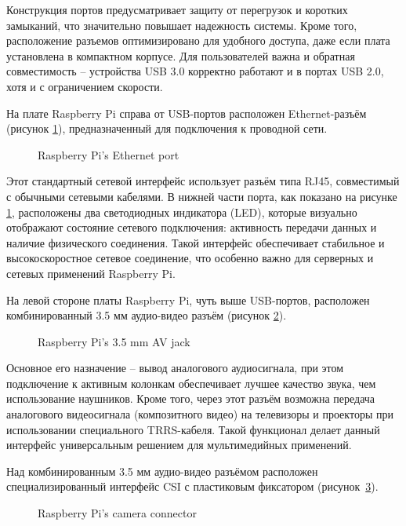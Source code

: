 Конструкция портов предусматривает защиту от перегрузок и коротких замыканий, что значительно повышает надежность системы. Кроме того, расположение разъемов оптимизировано для удобного доступа, даже если плата установлена в компактном корпусе. Для пользователей важна и обратная совместимость -- устройства USB 3.0 корректно работают и в портах USB 2.0, хотя и с ограничением скорости.

На плате Raspberry Pi справа от USB-портов расположен Ethernet-разъём (рисунок \ref{fig:ethernet}), предназначенный для подключения к проводной сети.

\begin{figure}[H]
	\centering
	\caption{Raspberry Pi’s Ethernet port}
	\label{fig:ethernet}
\end{figure}

Этот стандартный сетевой интерфейс использует разъём типа RJ45, совместимый с обычными сетевыми кабелями. В нижней части порта, как показано на рисунке \ref{fig:ethernet}, расположены два светодиодных индикатора (LED), которые визуально отображают состояние сетевого подключения: активность передачи данных и наличие физического соединения. Такой интерфейс обеспечивает стабильное и высокоскоростное сетевое соединение, что особенно важно для серверных и сетевых применений Raspberry Pi.

На левой стороне платы Raspberry Pi, чуть выше USB-портов, расположен комбинированный 3.5 мм аудио-видео разъём (рисунок \ref{fig:jack}).

\begin{figure}[H]
	\centering
	\caption{Raspberry Pi’s 3.5 mm AV jack}
	\label{fig:jack}
\end{figure}

Основное его назначение -- вывод аналогового аудиосигнала, при этом подключение к активным колонкам обеспечивает лучшее качество звука, чем использование наушников. Кроме того, через этот разъём возможна передача аналогового видеосигнала (композитного видео) на телевизоры и проекторы при использовании специального TRRS-кабеля. Такой функционал делает данный интерфейс универсальным решением для мультимедийных применений.

Над комбинированным 3.5 мм аудио-видео разъёмом расположен специализированный интерфейс CSI с пластиковым фиксатором (рисунок~\ref{fig:camera}).

\begin{figure}[H]
	\centering
	\caption{Raspberry Pi’s camera connector}
	\label{fig:camera}
\end{figure}

